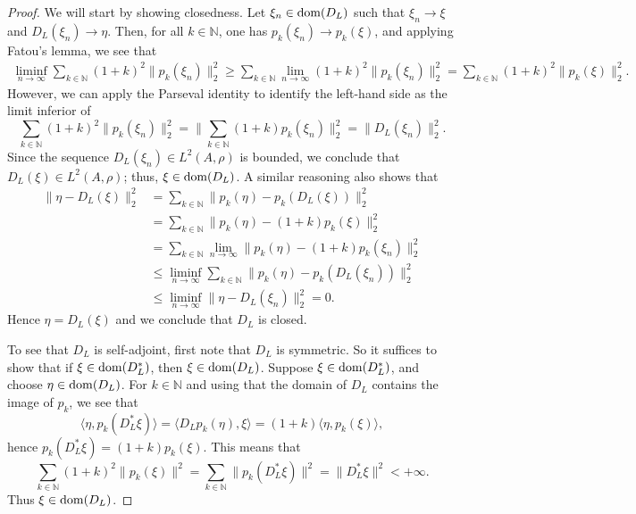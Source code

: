 \documentclass[11pt]{article}
\theoremstyle{definition}
\theoremstyle{remark}
\numberwithin{equation}{section}
\numberwithin{equation}{section}
\def\N{\mathbb{N}}
\numberwithin{equation}{section}
\begin{document}
\begin{proof}
    We will start by showing closedness. Let $\xi_n\in {\rm dom}(D_L)$ such that $\xi_n\to \xi$ and $D_L(\xi_n)\to\eta$. Then, for all $k\in\N$, one has $p_k(\xi_n)\to p_k(\xi)$, and applying Fatou's lemma, we see that 
    \begin{align*}
        \liminf_{n\to\infty}\sum_{k\in\N}(1+k)^2\|p_k(\xi_n)\|_2^2\geq \sum_{k\in\N}\lim_{n\to\infty}(1+k)^2\|p_k(\xi_n)\|_2^2=\sum_{k\in\N}(1+k)^2\|p_k(\xi)\|_2^2.
    \end{align*}
    However, we can apply the Parseval identity to identify the left-hand side as the limit inferior of
    $$
    \sum_{k\in\N}(1+k)^2\|p_k(\xi_n)\|^2_2=\Big\|\sum_{k\in\N}(1+k)p_k(\xi_n)\Big\|^2_2=\|D_L(\xi_n)\|^2_2.
    $$
    Since the sequence $D_L(\xi_n)\in L^{2}(A,\rho)$ is bounded, we conclude that $D_L(\xi)\in L^{2}(A,\rho)$; thus, $\xi\in {\rm dom}(D_L)$. A similar reasoning also shows that 
    \begin{align*}
        \|\eta-D_L(\xi)\|_2^2&=\sum_{k\in \N}\|p_k(\eta)-p_k(D_L(\xi))\|_2^2 \\
        &=\sum_{k\in \N}\|p_k(\eta)-(1+k)p_k(\xi)\|_2^2\\
        &=\sum_{k\in \N}\lim_{n\to \infty}\|p_k(\eta)-(1+k)p_k(\xi_n)\|_2^2 \\
        &\leq\liminf_{n\to \infty} \sum_{k\in \N}\|p_k(\eta)-p_k(D_L(\xi_n))\|_2^2 \\
        &\leq \liminf_{n\to \infty} \|\eta-D_L(\xi_n)\|_2^2=0.
    \end{align*}
    Hence $\eta=D_L(\xi)$ and we conclude that $D_L$ is closed. 

    To see that $D_{L}$ is self-adjoint, first note that $D_{L}$ is symmetric. So it suffices to show that if $\xi\in {\rm dom}(D_{L}^{*})$, then $\xi\in {\rm dom}(D_{L})$. Suppose $\xi\in {\rm dom}(D_{L}^{*})$, and choose $\eta\in {\rm dom}(D_{L})$. For $k\in\N$ and using that the domain of $D_{L}$ contains the image of $p_{k}$, we see that
    $$
    \langle \eta,p_k(D_L^*\xi)\rangle=\langle D_Lp_k(\eta),\xi\rangle=(1+k)\langle \eta,p_k(\xi)\rangle,
    $$
    hence $p_k(D_L^*\xi)=(1+k)p_k(\xi)$. This means that 
    $$
    \sum_{k\in\N}(1+k)^{2}\|p_{k}(\xi)\|^{2}=\sum_{k\in\N}\|p_{k}(D_L^*\xi)\|^{2}=\|D_L^*\xi\|^{2}<+\infty.
    $$
    Thus $\xi\in {\rm dom}(D_{L})$. \end{proof}
\end{document}

